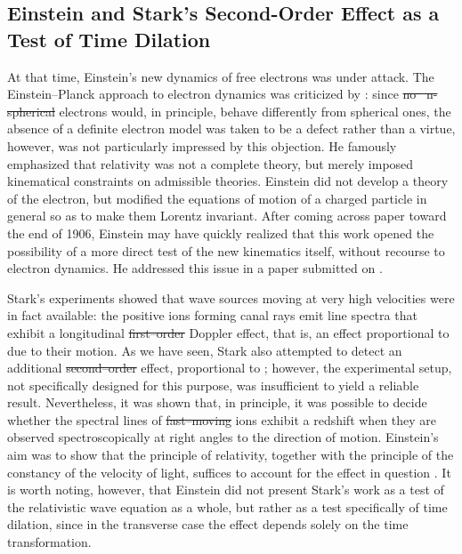 \documentclass[submitted,12pt]{article} %
\providecommand{\DIFadd}[1]{{\protect\color{blue}\uwave{#1}}} %
\providecommand{\DIFdel}[1]{{\protect\color{red}\sout{#1}}}                      %
\providecommand{\DIFaddbegin}{} %
\providecommand{\DIFaddend}{} %
\providecommand{\DIFdelbegin}{} %
\providecommand{\DIFdelend}{} %
\begin{document}
\DIFdelbegin %
\DIFdelend \DIFaddbegin \subsection{Einstein and Stark’s Second-Order Effect as a Test of Time Dilation}
\DIFaddend %
At that time, Einstein’s new dynamics of free electrons was under attack. The Einstein--Planck approach to electron dynamics was criticized by \citet{Ehrenfest1907}: since \DIFdelbegin \DIFdel{no\mbox{%
\citep[197]{Einstein1907d}}\hskip0pt%
n-spherical }\DIFdelend \DIFaddbegin \DIFadd{non-spherical }\DIFaddend electrons would, in principle, behave differently from spherical ones, the absence of a definite electron model was taken to be a defect rather than a virtue\DIFaddbegin \DIFadd{. }\DIFaddend \citet{Einstein1907a}, however, was not particularly impressed by this objection. He famously emphasized that relativity was not a complete theory, but merely imposed kinematical constraints on admissible theories. Einstein did not develop a theory of the electron, but modified the equations of motion of a charged particle in general so as to make them Lorentz invariant. After coming across  paper toward the end of 1906, Einstein may have quickly realized that this work opened the possibility of a more direct test of the new kinematics itself, without recourse to electron dynamics. He addressed this issue in a paper submitted on .

Stark’s experiments showed that wave sources moving at very high velocities were in fact available: the positive ions forming canal rays emit line spectra that exhibit a longitudinal \DIFdelbegin \DIFdel{first--order }\DIFdelend \DIFaddbegin \DIFadd{first-order }\DIFaddend Doppler effect, that is, an effect proportional to \betafactorh due to their motion. As we have seen, Stark also attempted to detect an additional \DIFdelbegin \DIFdel{second--order }\DIFdelend \DIFaddbegin \DIFadd{second-order }\DIFaddend effect, proportional to \betafactorsquaredh; however, the experimental setup, not specifically designed for this purpose, was insufficient to yield a reliable result. Nevertheless, it was shown that, in principle, it was possible to decide whether the spectral lines of \DIFdelbegin \DIFdel{fast--moving }\DIFdelend \DIFaddbegin \DIFadd{fast-moving }\DIFaddend ions exhibit a redshift when they are observed spectroscopically at right angles to the direction of motion. Einstein’s aim was to show that the principle of relativity, together with the principle of the constancy of the velocity of light, suffices to account for the effect in question \citep[197]{Einstein1907d}. It is worth noting, however, that Einstein did not present Stark’s work as a test of the relativistic wave equation as a whole, but rather as a test specifically of time dilation, since in the transverse case the effect depends solely on the time transformation.
\end{document}
